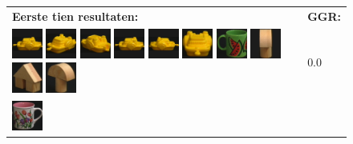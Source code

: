 \begin{figure}[tbp]
\begin{center}
\begin{tabular}{m{11cm} | m{3cm} |}
\textbf{Eerste tien resultaten:} & \textbf{GGR:} \\
\vspace{4pt}
\includegraphics[width=1cm]{coil/beeld-12.eps}
\includegraphics[width=1cm]{coil/beeld-15.eps}
\includegraphics[width=1cm]{coil/beeld-16.eps}
\includegraphics[width=1cm]{coil/beeld-12.eps}
\includegraphics[width=1cm]{coil/beeld-13.eps}
\includegraphics[width=1cm]{coil/beeld-14.eps}
\includegraphics[width=1cm]{coil/beeld-31.eps}
\includegraphics[width=1cm]{coil/beeld-2.eps}
\includegraphics[width=1cm]{coil/beeld-46.eps}
\includegraphics[width=1cm]{coil/beeld-4.eps}
& {\scriptsize 0.0}
\\
\includegraphics[width=1cm]{coil/beeld-6.eps}

\end{tabular}
\end{center}
\end{figure}
